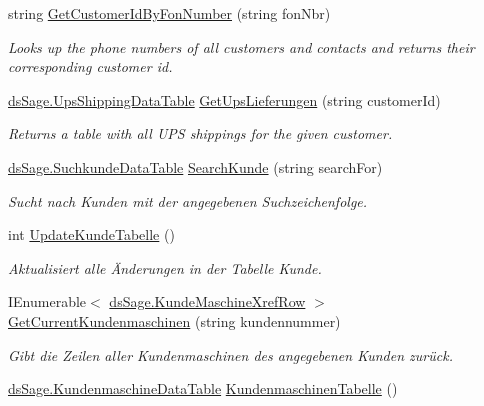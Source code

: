 \begin{DoxyCompactItemize}
\item 
string \hyperlink{class_products_1_1_data_1_1_data_service_a529e2f556953aa2c61be709859678869}{Get\+Customer\+Id\+By\+Fon\+Number} (string fon\+Nbr)
\begin{DoxyCompactList}\small\item\em Looks up the phone numbers of all customers and contacts and returns their corresponding customer id. \end{DoxyCompactList}\item 
\hyperlink{class_products_1_1_data_1_1ds_sage_1_1_ups_shipping_data_table}{ds\+Sage.\+Ups\+Shipping\+Data\+Table} \hyperlink{class_products_1_1_data_1_1_data_service_acfe0622c3323738525940e59975e84cd}{Get\+Ups\+Lieferungen} (string customer\+Id)
\begin{DoxyCompactList}\small\item\em Returns a table with all U\+PS shippings for the given customer. \end{DoxyCompactList}\item 
\hyperlink{class_products_1_1_data_1_1ds_sage_1_1_suchkunde_data_table}{ds\+Sage.\+Suchkunde\+Data\+Table} \hyperlink{class_products_1_1_data_1_1_data_service_ae1e10bf8f5721e91f59cf1e87d26990c}{Search\+Kunde} (string search\+For)
\begin{DoxyCompactList}\small\item\em Sucht nach Kunden mit der angegebenen Suchzeichenfolge. \end{DoxyCompactList}\item 
int \hyperlink{class_products_1_1_data_1_1_data_service_a6c5e7b6cf9eb6d6b51544c291c066894}{Update\+Kunde\+Tabelle} ()
\begin{DoxyCompactList}\small\item\em Aktualisiert alle Änderungen in der Tabelle Kunde. \end{DoxyCompactList}\item 
I\+Enumerable$<$ \hyperlink{class_products_1_1_data_1_1ds_sage_1_1_kunde_maschine_xref_row}{ds\+Sage.\+Kunde\+Maschine\+Xref\+Row} $>$ \hyperlink{class_products_1_1_data_1_1_data_service_a44fcda71ba1fc751abf8b01cc0b00517}{Get\+Current\+Kundenmaschinen} (string kundennummer)
\begin{DoxyCompactList}\small\item\em Gibt die Zeilen aller Kundenmaschinen des angegebenen Kunden zurück. \end{DoxyCompactList}\item 
\hyperlink{class_products_1_1_data_1_1ds_sage_1_1_kundenmaschine_data_table}{ds\+Sage.\+Kundenmaschine\+Data\+Table} \hyperlink{class_products_1_1_data_1_1_data_service_a0d210e05a70eae8ced7b905aa7ffeb6b}{Kundenmaschinen\+Tabelle} ()

\end{DoxyCompactItemize}
